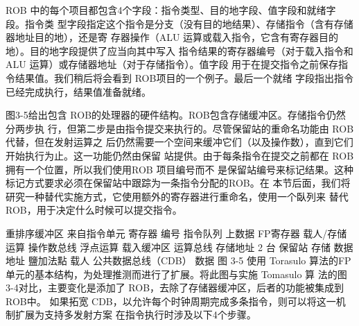 ROB 中的每个项目都包含4个字段：指令类型、目的地字段、值字段和就绪字段。指令类
型字段指定这个指令是分支（没有目的地结果）、存储指令（含有存储器地址目的地），还是寄
存器操作（ALU 运算或载入指令，它含有寄存器目的地）。目的地字段提供了应当向其中写入
指令结果的寄存器编号（对于载入指令和 ALU 运算）或存储器地址（对于存储指令）。值字段
用于在提交指令之前保存指令结果值。我们稍后将会看到 ROB项目的一个例子。最后一个就绪
字段指出指令已经完成执行，结果值准备就绪。

图3-5给出包含 ROB的处理器的硬件结构。ROB包含存储缓冲区。存储指令仍然分两步执
行，但第二步是由指令提交来执行的。尽管保留站的重命名功能由 ROB代替，但在发射运算之
后仍然需要一个空间来缓冲它们（以及操作数），直到它们开始执行为止。这一功能仍然由保留
站提供。由于每条指令在提交之前都在 ROB拥有一个位置，所以我们使用ROB 项目编号而不
是保留站编号来标记结果。这种标记方式要求必须在保留站中跟踪为一条指令分配的ROB。在
本节后面，我们将研究一种替代实施方式，它使用额外的寄存器进行重命名，使用一个臥列来
替代ROB，用于决定什么时候可以提交指令。

重排序缓冲区
来自指令单元
寄存器
编号
指令队列
上数据
FP寄存器
载人/存储运算
操作数总线
浮点运算
载入缓冲区
运算总线
存储地址
2
台
保留站
存储
数据
地址
鹽加法點
载人
公共数据总线（CDB）
数据
图 3-5
使用 Torasulo 算法的FP单元的基本结构，为处理推测而进行了扩展。将此图与实施 Tomasulo 算
法的图3-4对比，主要变化是添加了 ROB，去除了存储器缓冲区，后者的功能被集成到 ROB中。
如果拓宽 CDB，以允许每个时钟周期完成多条指令，则可以将这一机制扩展为支持多发射方案
在指令执行时涉及以下4个步骤。

